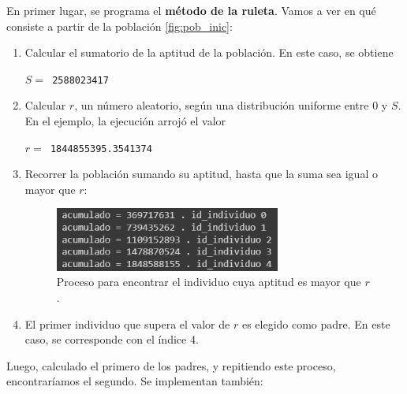 \documentclass[12pt,a4paper]{book}
\begin{document}
En primer lugar, se programa el \textbf{método de la ruleta}. Vamos a ver en qué consiste a partir de la población \ref{fig:pob_inic}:

\begin{enumerate}
			\item Calcular el sumatorio de la aptitud de la población. En este caso, se obtiene 
			\begin{center} 
			$S = $\texttt{ 2588023417}
				 \end{center}	 
			\item Calcular $r$, un número aleatorio, según una distribución uniforme entre $0$ y $S$. En el ejemplo, la ejecución arrojó el valor 
			\begin{center}
			$r = $\texttt{ 1844855395.3541374}
			\end{center}
			
			\item Recorrer la población sumando su aptitud, hasta que la suma sea igual o mayor que $r$:
			
			\begin{figure}[H] 
    	\begin{center}
    	\includegraphics[width=0.7\textwidth]{img/ruleta.png}
    	\end{center}
    	\caption{Proceso para encontrar el individuo cuya aptitud es mayor que $r$.}
    	\label{fig:ruleta}
	\end{figure}
			
			
			\item El primer individuo que supera el valor de $r$ es elegido como padre. En este caso, se corresponde con el índice 4. 
\end{enumerate}
Luego, calculado el primero de los padres, y repitiendo este proceso, encontraríamos el segundo. Se implementan también: 
\end{document}
